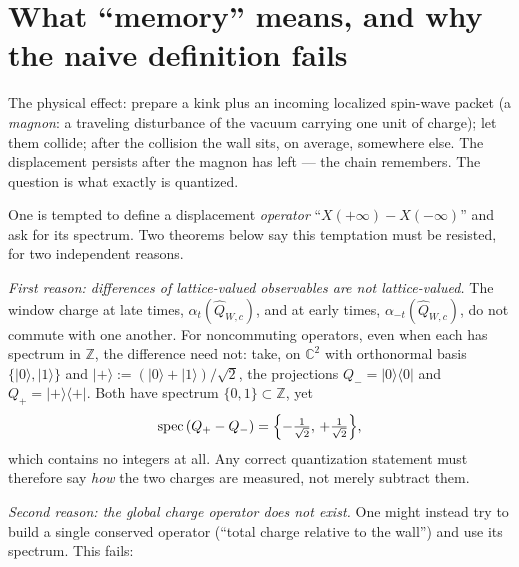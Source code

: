 \documentclass[11pt]{article}
\theoremstyle{definition}
\theoremstyle{remark}
\newcommand{\Z}{\mathbb{Z}}
\newcommand{\C}{\mathbb{C}}
\newcommand{\spec}{\operatorname{spec}}
\begin{document}
\section{What ``memory'' means, and why the naive definition fails}
\label{sec:naive}

The physical effect: prepare a kink plus an incoming localized spin-wave
packet (a \emph{magnon}: a traveling disturbance of the vacuum carrying one
unit of charge); let them collide; after the collision the wall sits, on
average, somewhere else.  The displacement persists after the magnon has
left --- the chain remembers.  The question is what exactly is quantized.

One is tempted to define a displacement \emph{operator}
``$X(+\infty)-X(-\infty)$'' and ask for its spectrum.  Two theorems below say
this temptation must be resisted, for two independent reasons.

\emph{First reason: differences of lattice-valued observables are not
lattice-valued.}  The window charge at late times,
$\alpha_t(\widehat{Q}_{W,c})$, and at early times,
$\alpha_{-t}(\widehat{Q}_{W,c})$, do not commute with one another.  For
noncommuting operators, even when each has spectrum in $\Z$, the difference
need not: take, on $\C^2$ with orthonormal basis $\{|0\rangle,|1\rangle\}$ and
$|+\rangle:=(|0\rangle+|1\rangle)/\sqrt2$, the projections
$Q_-=|0\rangle\langle 0|$ and $Q_+=|+\rangle\langle +|$.  Both have spectrum
$\{0,1\}\subset\Z$, yet
\[
\spec\,(Q_+-Q_-)=\Bigl\{-\tfrac{1}{\sqrt2},\,+\tfrac{1}{\sqrt2}\Bigr\},
\]
which contains no integers at all.  Any correct quantization statement must
therefore say \emph{how} the two charges are measured, not merely subtract
them.

\emph{Second reason: the global charge operator does not exist.}  One might
instead try to build a single conserved operator (``total charge relative to
the wall'') and use its spectrum.  This fails:
\end{document}
